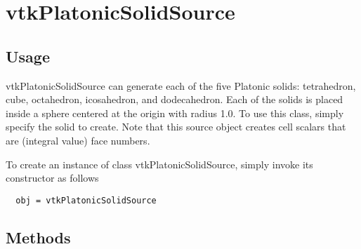 \section{vtkPlatonicSolidSource}

\subsection{Usage}

 vtkPlatonicSolidSource can generate each of the five Platonic solids:
 tetrahedron, cube, octahedron, icosahedron, and dodecahedron. Each of the
 solids is placed inside a sphere centered at the origin with radius 1.0.
 To use this class, simply specify the solid to create. Note that this
 source object creates cell scalars that are (integral value) face numbers.

To create an instance of class vtkPlatonicSolidSource, simply
invoke its constructor as follows
\begin{verbatim}
  obj = vtkPlatonicSolidSource
\end{verbatim}
\subsection{Methods}

